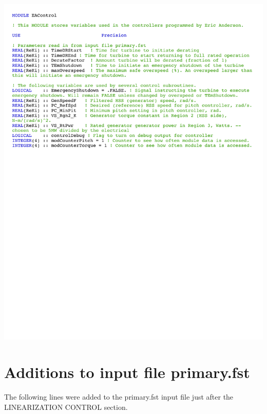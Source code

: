 \noindent
\includegraphics[width=\linewidth]{Figures/AppendixDFigures/figD-5.pdf}

\section{Additions to input file primary.fst} \label{sectionD-7}

The following lines were added to the primary.fst input file just after the LINEARIZATION CONTROL section.

